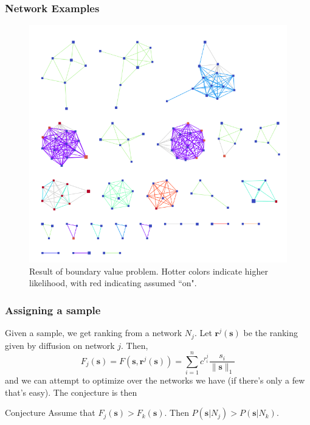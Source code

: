 \documentclass{beamer}
\renewcommand{\b}{\bm}
\begin{document}
\begin{frame}
\frametitle{Network Examples}
\begin{figure}
	\begin{center}
	\includegraphics[scale = 0.25]{../ranked_bdvp.png}	
\end{center}
\caption{Result of boundary value problem. Hotter colors indicate higher likelihood, with red indicating assumed ``on".}
\end{figure}
\end{frame}
\begin{frame}
\frametitle{Assigning a sample}
 Given a sample, we get ranking from a network $N_j$. Let $\b{r}^j(\b{s})$ be the ranking given by diffusion on network $j$. Then,
\[
F_j(\b{s}) = F(\b{s},\b{r}^j(\b{s})) = \sum_{i=1}^n c^{r_i^j} \frac{s_i}{\|\b{s}\|_1}
\]
and we can attempt to optimize over the networks we have (if there's only a few that's easy). The conjecture is then
\begin{block}{Conjecture}
	Assume that $F_j(\b{s}) > F_k(\b{s})$. Then $P(\b{s}|N_j) > P(\b{s}|N_k)$.
\end{block}
\end{frame}
\end{document}
